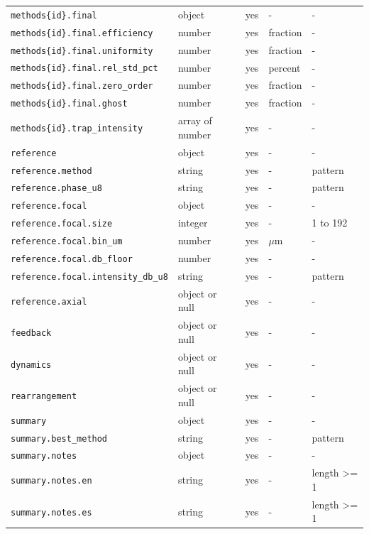 \begin{longtable}{@{}l l c l l@{}}
\texttt{methods\{id\}.final} & object & yes & - & -\\
\texttt{methods\{id\}.final.efficiency} & number & yes & fraction & -\\
\texttt{methods\{id\}.final.uniformity} & number & yes & fraction & -\\
\texttt{methods\{id\}.final.rel\_std\_pct} & number & yes & percent & -\\
\texttt{methods\{id\}.final.zero\_order} & number & yes & fraction & -\\
\texttt{methods\{id\}.final.ghost} & number & yes & fraction & -\\
\texttt{methods\{id\}.trap\_intensity} & array of number & yes & - & -\\
\texttt{reference} & object & yes & - & -\\
\texttt{reference.method} & string & yes & - & pattern\\
\texttt{reference.phase\_u8} & string & yes & - & pattern\\
\texttt{reference.focal} & object & yes & - & -\\
\texttt{reference.focal.size} & integer & yes & - & 1 to 192\\
\texttt{reference.focal.bin\_um} & number & yes & $\mu$m & -\\
\texttt{reference.focal.db\_floor} & number & yes & - & -\\
\texttt{reference.focal.intensity\_db\_u8} & string & yes & - & pattern\\
\texttt{reference.axial} & object or null & yes & - & -\\
\texttt{feedback} & object or null & yes & - & -\\
\texttt{dynamics} & object or null & yes & - & -\\
\texttt{rearrangement} & object or null & yes & - & -\\
\texttt{summary} & object & yes & - & -\\
\texttt{summary.best\_method} & string & yes & - & pattern\\
\texttt{summary.notes} & object & yes & - & -\\
\texttt{summary.notes.en} & string & yes & - & length >= 1\\
\texttt{summary.notes.es} & string & yes & - & length >= 1\\
\bottomrule\end{longtable}
\endgroup

